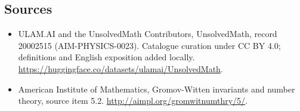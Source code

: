 \documentclass[11pt]{article}
\begin{document}
\subsection{Sources}
\begin{itemize}
\item[\hypertarget{source:20002515:1}{S1}] ULAM.AI and the UnsolvedMath Contributors, UnsolvedMath, record 20002515 (AIM-PHYSICS-0023). Catalogue curation under CC BY 4.0; definitions and English exposition added locally.
\url{https://huggingface.co/datasets/ulamai/UnsolvedMath}.
\item[\hypertarget{source:20002515:2}{S2}] American Institute of Mathematics, Gromov-Witten invariants and number theory, source item 5.2.
\url{http://aimpl.org/gromwitnumthry/5/}.
\end{itemize}
\label{end:20002515}
\end{document}
